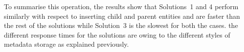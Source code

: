 To summarise this operation, the results show that Solutions~1 and 4 perform
similarly with respect to inserting child and parent entities and are faster
 than the rest of the solutions while Solution~3 is the slowest for both the
 cases. the different response times for the solutions are owing to the
 different styles of metadata storage as explained previously.

%  
% 

		
\newpage

